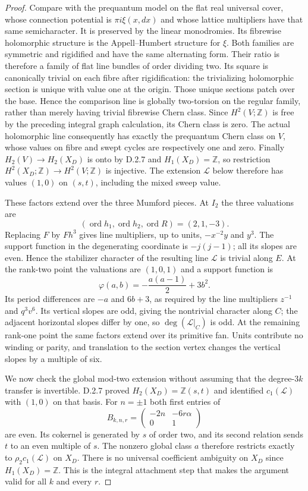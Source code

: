 \begin{proof}
Compare with the prequantum model on the flat real universal
cover, whose connection potential is $\pi i\xi(x,dx)$ and
whose lattice multipliers have that same semicharacter.
It is preserved by the linear monodromies. Its fibrewise
holomorphic structure is the Appell--Humbert structure for $\xi$.
Both families are symmetric and rigidified and have the same
alternating form. Their ratio is therefore a family of flat
line bundles of order dividing two. Its square is canonically
trivial on each fibre after rigidification: the trivializing
holomorphic section is unique with value one at the origin.
Those unique sections patch over the base. Hence the comparison
line is globally two-torsion on the regular family, rather than
merely having trivial fibrewise Chern class. Since $H^2(V;\mathbb Z)$
is free by the preceding integral graph calculation, its Chern
class is zero. The actual holomorphic line consequently has
exactly the prequantum Chern class on $V$, whose values on
fibre and swept cycles are respectively one and zero.
Finally $H_2(V)\to H_2(X_D)$ is onto by D.2.7 and
$H_1(X_D)=\mathbb Z$, so restriction
$H^2(X_D;\mathbb Z)\to H^2(V;\mathbb Z)$ is injective.
The extension $\mathcal L$ below therefore has values $(1,0)$
on $(s,t)$, including the mixed sweep value.

These factors extend over the three Mumford pieces. At $I_2$
the three valuations are
\[
 (\operatorname{ord}h_1,\operatorname{ord}h_2,
   \operatorname{ord}R)=(2,1,-3).
\]
Replacing $F$ by $Fh^3$ gives line multipliers, up to units,
$-x^{-2}y$ and $y^3$. The support function in the degenerating
coordinate is $-j(j-1)$; all its slopes are even. Hence the
stabilizer character of the resulting line $\mathcal L$ is
trivial along $E$. At the rank-two point the valuations are
$(1,0,1)$ and a support function is
\[
 \varphi(a,b)=-\frac{a(a-1)}2+3b^2.
\]
Its period differences are $-a$ and $6b+3$, as required by
the line multipliers $z^{-1}$ and $q^3v^6$.
Its vertical slopes are odd, giving the nontrivial character
along $C$; the adjacent horizontal slopes differ by one, so
$\deg(\mathcal L|_C)$ is odd. At the remaining rank-one
point the same factors extend over its primitive fan.
Units contribute no winding or parity, and translation to the
section vertex changes the vertical slopes by a multiple of six.

We now check the global mod-two extension without assuming that
the degree-$3k$ transfer is invertible. D.2.7 proved
$H_2(X_D)=\mathbb Z(s,t)$ and identified
$c_1(\mathcal L)$ with $(1,0)$ on that basis.
For $n=\pm1$ both first entries of
\[
 B_{k,n,r}=\begin{pmatrix}-2n&-6r\alpha\\0&1\end{pmatrix}
\]
are even. Its cokernel is generated by $s$ of order two, and
its second relation sends $t$ to an even multiple of $s$.
The nonzero global class $a$ therefore restricts exactly to
$\rho_2c_1(\mathcal L)$ on $X_D$. There is no universal
coefficient ambiguity on $X_D$ since $H_1(X_D)=\mathbb Z$.
This is the integral attachment step that makes the argument
valid for all $k$ and every $r$.


\end{proof}
